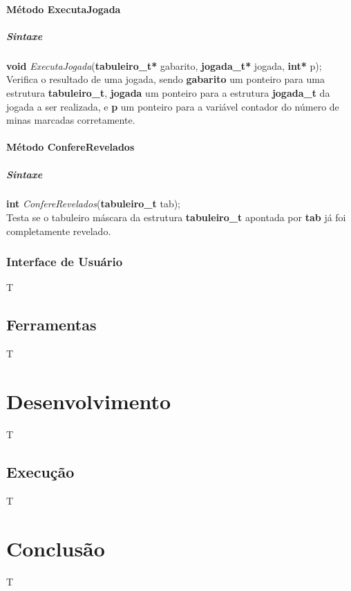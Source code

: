 \documentclass[10pt,a4paper]{report}
\begin{document}
\subsubsection{Método ExecutaJogada}
\paragraph{Sintaxe}
\textbf{void} {\it ExecutaJogada}(\textbf{tabuleiro\_t*} gabarito, \textbf{jogada\_t*} jogada, \textbf{int*} p);\\
Verifica o resultado de uma jogada, sendo \textbf{gabarito} um ponteiro para uma estrutura \textbf{tabuleiro\_t}, \textbf{jogada} um ponteiro para a estrutura \textbf{jogada\_t} da jogada a ser realizada, e \textbf{p} um ponteiro para a variável contador do número de minas marcadas corretamente.
\subsubsection{Método ConfereRevelados}
\paragraph{Sintaxe}
\textbf{int} {\it ConfereRevelados}(\textbf{tabuleiro\_t} tab);\\
Testa se o tabuleiro máscara da estrutura \textbf{tabuleiro\_t} apontada por \textbf{tab} já foi completamente revelado.
\subsection{Interface de Usuário}
T
\section{Ferramentas}
T
\chapter{Desenvolvimento}
T
\section{Execução}
T
\chapter{Conclusão}
T
\end{document}
